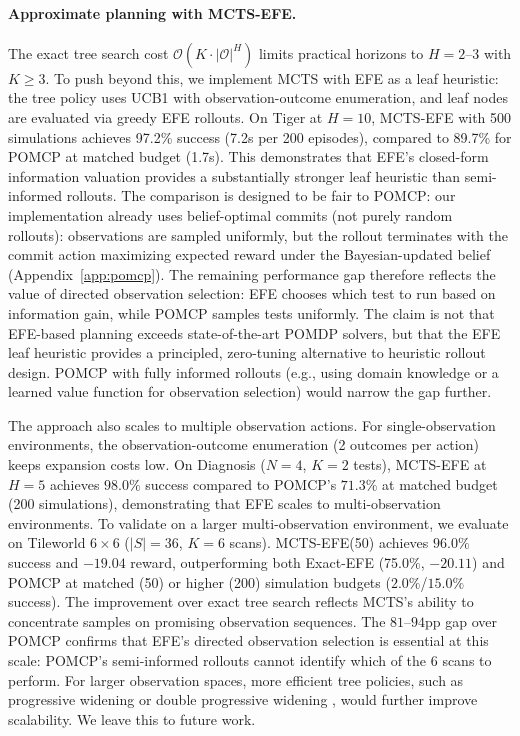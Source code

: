 \documentclass[runningheads]{llncs}
\begin{document}
\paragraph{Approximate planning with MCTS-EFE.}
The exact tree search cost $\mathcal{O}(K \cdot |\mathcal{O}|^H)$ limits practical horizons to $H{=}2$--$3$ with $K \geq 3$. To push beyond this, we implement MCTS with EFE as a leaf heuristic: the tree policy uses UCB1 with observation-outcome enumeration, and leaf nodes are evaluated via greedy EFE rollouts. On Tiger at $H{=}10$, MCTS-EFE with 500 simulations achieves 97.2\% success (7.2s per 200 episodes), compared to 89.7\% for POMCP at matched budget (1.7s). This demonstrates that EFE's closed-form information valuation provides a substantially stronger leaf heuristic than semi-informed rollouts. The comparison is designed to be fair to POMCP: our implementation already uses belief-optimal commits (not purely random rollouts): observations are sampled uniformly, but the rollout terminates with the commit action maximizing expected reward under the Bayesian-updated belief (Appendix~\ref{app:pomcp}). The remaining performance gap therefore reflects the value of directed observation selection: EFE chooses which test to run based on information gain, while POMCP samples tests uniformly. The claim is not that EFE-based planning exceeds state-of-the-art POMDP solvers, but that the EFE leaf heuristic provides a principled, zero-tuning alternative to heuristic rollout design. POMCP with fully informed rollouts (e.g., using domain knowledge or a learned value function for observation selection) would narrow the gap further.

The approach also scales to multiple observation actions. For single-observation environments, the observation-outcome enumeration (2 outcomes per action) keeps expansion costs low. On Diagnosis ($N{=}4$, $K{=}2$ tests), MCTS-EFE at $H{=}5$ achieves $98.0\%$ success compared to POMCP's $71.3\%$ at matched budget (200 simulations), demonstrating that EFE scales to multi-observation environments. To validate on a larger multi-observation environment, we evaluate on Tileworld $6{\times}6$ ($|S|{=}36$, $K{=}6$ scans). MCTS-EFE(50) achieves $96.0\%$ success and $-19.04$ reward, outperforming both Exact-EFE (75.0\%, $-20.11$) and POMCP at matched (50) or higher (200) simulation budgets ($2.0\%$/$15.0\%$ success). The improvement over exact tree search reflects MCTS's ability to concentrate samples on promising observation sequences. The $81$--$94$pp gap over POMCP confirms that EFE's directed observation selection is essential at this scale: POMCP's semi-informed rollouts cannot identify which of the 6 scans to perform. For larger observation spaces, more efficient tree policies, such as progressive widening or double progressive widening \citep{benchetrit2025}, would further improve scalability. We leave this to future work.
\end{document}
